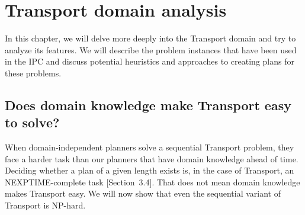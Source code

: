 

\section{Transport domain analysis}

In this chapter, we will delve more deeply into the Transport domain and try to analyze its features.
We will describe the problem instances that have been used in the IPC and discuss potential
heuristics and approaches to creating plans for these problems.

\subsection{Does domain knowledge make Transport easy to solve?}

When domain-independent planners solve a sequential Transport problem,
they face a harder task than our planners that have domain knowledge ahead of time.
Deciding whether a plan of a given length exists is, in the case of Transport,
an NEXPTIME-complete task \citep{Ghallab2004}[Section~3.4].
That does not mean domain knowledge makes Transport easy. We will now show
that even the sequential variant of Transport is NP-hard.

